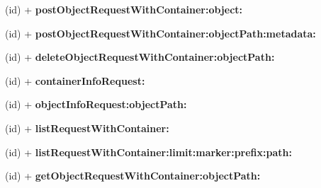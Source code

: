 \begin{DoxyCompactItemize}
\item 
\hypertarget{interface_a_s_i_cloud_files_object_request_ae713a0e0f7867895b33210be74770c47}{
(id) + {\bfseries post\-Object\-Request\-With\-Container\-:object\-:}}
\label{interface_a_s_i_cloud_files_object_request_ae713a0e0f7867895b33210be74770c47}

\item 
\hypertarget{interface_a_s_i_cloud_files_object_request_a594d1d7c8fc812dc9acc2c862809b603}{
(id) + {\bfseries post\-Object\-Request\-With\-Container\-:object\-Path\-:metadata\-:}}
\label{interface_a_s_i_cloud_files_object_request_a594d1d7c8fc812dc9acc2c862809b603}

\item 
\hypertarget{interface_a_s_i_cloud_files_object_request_a55f1c9c4f71e7e3314b23d144b96fbac}{
(id) + {\bfseries delete\-Object\-Request\-With\-Container\-:object\-Path\-:}}
\label{interface_a_s_i_cloud_files_object_request_a55f1c9c4f71e7e3314b23d144b96fbac}

\item 
\hypertarget{interface_a_s_i_cloud_files_object_request_ab9af59ae6c15be52c702e45fca805db9}{
(id) + {\bfseries container\-Info\-Request\-:}}
\label{interface_a_s_i_cloud_files_object_request_ab9af59ae6c15be52c702e45fca805db9}

\item 
\hypertarget{interface_a_s_i_cloud_files_object_request_a4b4f0ea695cdec431818f4ca24a8a1cf}{
(id) + {\bfseries object\-Info\-Request\-:object\-Path\-:}}
\label{interface_a_s_i_cloud_files_object_request_a4b4f0ea695cdec431818f4ca24a8a1cf}

\item 
\hypertarget{interface_a_s_i_cloud_files_object_request_ad140f7f65fef97218ff5a8853afbc0c7}{
(id) + {\bfseries list\-Request\-With\-Container\-:}}
\label{interface_a_s_i_cloud_files_object_request_ad140f7f65fef97218ff5a8853afbc0c7}

\item 
\hypertarget{interface_a_s_i_cloud_files_object_request_a67e5f2848052dcdf80aac2ffd4f64525}{
(id) + {\bfseries list\-Request\-With\-Container\-:limit\-:marker\-:prefix\-:path\-:}}
\label{interface_a_s_i_cloud_files_object_request_a67e5f2848052dcdf80aac2ffd4f64525}

\item 
\hypertarget{interface_a_s_i_cloud_files_object_request_ac41ac1686f40dd0b25f473b95de56a2b}{
(id) + {\bfseries get\-Object\-Request\-With\-Container\-:object\-Path\-:}}
\label{interface_a_s_i_cloud_files_object_request_ac41ac1686f40dd0b25f473b95de56a2b}


\end{DoxyCompactItemize}
